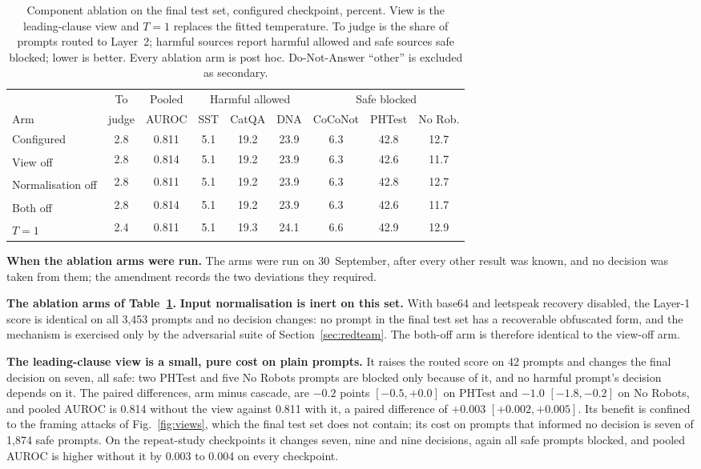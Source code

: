 \documentclass[journal]{IEEEtran}
\newcommand{\posthoc}{\textsuperscript{\dag}}
\begin{document}
\begin{table}[h]
\caption{Component ablation on the final test set, configured checkpoint,
percent. View is the leading-clause view and $T=1$ replaces the fitted
temperature. To judge is the share of prompts routed to Layer~2; harmful sources
report harmful allowed and safe sources safe blocked; lower is better. Every
ablation arm is post hoc. Do-Not-Answer ``other'' is excluded as secondary.}
\label{tab:ablation}
\centering
\scriptsize
\setlength{\tabcolsep}{2.5pt}
\begin{tabular}{@{}lcccccccc@{}}
\toprule
& To & Pooled & \multicolumn{3}{c}{Harmful allowed} & \multicolumn{3}{c}{Safe blocked} \\
\cmidrule(lr){4-6}\cmidrule(lr){7-9}
Arm & judge & AUROC & SST & CatQA & DNA & CoCoNot & PHTest & No Rob. \\
\midrule
Configured                 & 2.8 & 0.811 & 5.1 & 19.2 & 23.9 & 6.3 & 42.8 & 12.7 \\
View off\posthoc            & 2.8 & 0.814 & 5.1 & 19.2 & 23.9 & 6.3 & 42.6 & 11.7 \\
Normalisation off\posthoc  & 2.8 & 0.811 & 5.1 & 19.2 & 23.9 & 6.3 & 42.8 & 12.7 \\
Both off\posthoc           & 2.8 & 0.814 & 5.1 & 19.2 & 23.9 & 6.3 & 42.6 & 11.7 \\
$T=1$\posthoc               & 2.4 & 0.811 & 5.1 & 19.3 & 24.1 & 6.6 & 42.9 & 12.9 \\
\bottomrule
\end{tabular}
\end{table}

\noindent\textbf{When the ablation arms were run.} The arms were run on
30~September, after every other result was known, and no decision was taken
from them; the amendment records the two deviations they required.

\noindent\textbf{The ablation arms of Table~\ref{tab:ablation}.}
\textbf{Input normalisation is inert on this set.} With base64 and leetspeak
recovery disabled, the Layer-1 score is identical on all 3{,}453 prompts and no
decision changes: no prompt in the final test set has a recoverable obfuscated
form, and the mechanism is exercised only by the adversarial suite of
Section~\ref{sec:redteam}. The both-off arm is therefore identical to the
view-off arm.

\textbf{The leading-clause view is a small, pure cost on plain prompts.} It
raises the routed score on 42 prompts and changes the final decision on seven,
all safe: two PHTest and five No Robots prompts are blocked only because of it,
and no harmful prompt's decision depends on it. The paired differences, arm
minus cascade, are $-0.2$ points $[-0.5, +0.0]$ on PHTest and $-1.0$ $[-1.8,
-0.2]$ on No Robots, and pooled AUROC is \num{0.814} without the view against
\num{0.811} with it, a paired difference of $+0.003$ $[+0.002, +0.005]$. Its
benefit is confined to the framing attacks of Fig.~\ref{fig:views}, which the
final test set does not contain; its cost on prompts that informed no decision
is seven of 1{,}874 safe prompts. On the repeat-study checkpoints it changes
seven, nine and nine decisions, again all safe prompts blocked, and pooled
AUROC is higher without it by \num{0.003} to \num{0.004} on every checkpoint.
\end{document}
